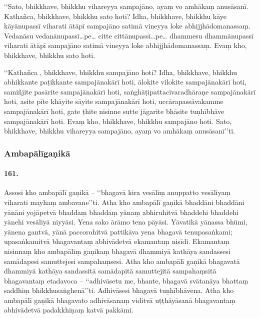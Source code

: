 ‘‘Sato, bhikkhave, bhikkhu vihareyya sampajāno, ayaṃ vo amhākaṃ anusāsanī. Kathañca, bhikkhave, bhikkhu sato hoti? Idha, bhikkhave, bhikkhu kāye kāyānupassī viharati ātāpī sampajāno satimā vineyya loke abhijjhādomanassaṃ. Vedanāsu vedanānupassī…pe… citte cittānupassī…pe… dhammesu dhammānupassī viharati ātāpī sampajāno satimā vineyya loke abhijjhādomanassaṃ. Evaṃ kho, bhikkhave, bhikkhu sato hoti.

‘‘Kathañca , bhikkhave, bhikkhu sampajāno hoti? Idha, bhikkhave, bhikkhu abhikkante paṭikkante sampajānakārī hoti, ālokite vilokite sampajānakārī hoti, samiñjite pasārite sampajānakārī hoti, saṅghāṭipattacīvaradhāraṇe sampajānakārī hoti, asite pīte khāyite sāyite sampajānakārī hoti, uccārapassāvakamme sampajānakārī hoti, gate ṭhite nisinne sutte jāgarite bhāsite tuṇhībhāve sampajānakārī hoti. Evaṃ kho, bhikkhave, bhikkhu sampajāno hoti. Sato, bhikkhave, bhikkhu vihareyya sampajāno, ayaṃ vo amhākaṃ anusāsanī’’ti.

\subsubsection{Ambapālīgaṇikā}

\paragraph{161.} Assosi kho ambapālī gaṇikā – ‘‘bhagavā kira vesāliṃ anuppatto vesāliyaṃ viharati mayhaṃ ambavane’’ti. Atha kho ambapālī gaṇikā bhaddāni bhaddāni yānāni yojāpetvā bhaddaṃ bhaddaṃ yānaṃ abhiruhitvā bhaddehi bhaddehi yānehi vesāliyā niyyāsi. Yena sako ārāmo tena pāyāsi. Yāvatikā yānassa bhūmi, yānena gantvā, yānā paccorohitvā pattikāva yena bhagavā tenupasaṅkami; upasaṅkamitvā bhagavantaṃ abhivādetvā ekamantaṃ nisīdi. Ekamantaṃ nisinnaṃ kho ambapāliṃ gaṇikaṃ bhagavā dhammiyā kathāya sandassesi samādapesi samuttejesi sampahaṃsesi. Atha kho ambapālī gaṇikā bhagavatā dhammiyā kathāya sandassitā samādapitā samuttejitā sampahaṃsitā bhagavantaṃ etadavoca – ‘‘adhivāsetu me, bhante, bhagavā svātanāya bhattaṃ saddhiṃ bhikkhusaṅghenā’’ti. Adhivāsesi bhagavā tuṇhībhāvena. Atha kho ambapālī gaṇikā bhagavato adhivāsanaṃ viditvā uṭṭhāyāsanā bhagavantaṃ abhivādetvā padakkhiṇaṃ katvā pakkāmi.

